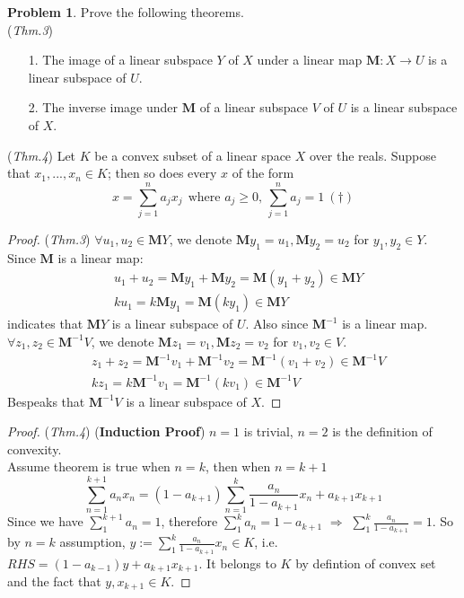 \documentclass[a4paper, 10pt]{article}
\theoremstyle{definition}
\newtheorem{problem}{Problem}
\theoremstyle{hSol}
\begin{document}
\begin{problem} Prove the following theorems. \\
(\textit{Thm.3}) 
\begin{itemize}
  \item[1.] The image of a linear subspace $Y$ of $X$ under a linear map $\bm{M}:X\to U$ is a linear subspace of $U$.
  \item[2.] The inverse image under $\bm{M}$ of a linear subspace $V$ of $U$ is a linear subspace of $X$.
\end{itemize}
(\textit{Thm.4}) Let $K$ be a convex subset of a linear space $X$ over the reals. Suppose that $x_1, ..., x_n\in K$; then so does every $x$ of the form
$$x=\sum_{j=1}^n a_jx_j~~\text{where $a_j\geq 0$, $\sum_{j=1}^n a_j=1$}~(\dag)$$
\end{problem}
\begin{proof} (\textit{Thm.3}) $\forall u_1, u_2 \in \bm{M}Y$, we denote $\bm{M}y_1 = u_1, \bm{M}y_2 = u_2$ for $y_1, y_2 \in Y$. \\
Since $\bm{M}$ is a linear map:
\begin{equation}
  \begin{split}
    &u_1+u_2 = \bm{M}y_1 + \bm{M}y_2 = \bm{M}(y_1+y_2) \in \bm{M}Y \\
    &ku_1 = k\bm{M}y_1 = \bm{M}(ky_1) \in \bm{M}Y
  \end{split}
\end{equation}
indicates that $\bm{M}Y$ is a linear subspace of $U$. Also since $\bm{M}^{-1}$ is a linear map. $\forall z_1, z_2 \in \bm{M}^{-1}V$, we denote $\bm{M}z_1 = v_1, \bm{M}z_2 = v_2$ for $v_1, v_2 \in V$.
\begin{equation}
  \begin{split}
    &z_1+z_2 = \bm{M}^{-1}v_1 + \bm{M}^{-1}v_2 = \bm{M}^{-1}(v_1+v_2) \in \bm{M}^{-1}V \\
    &kz_1 = k\bm{M}^{-1}v_1 = \bm{M}^{-1}(kv_1) \in \bm{M}^{-1}V
  \end{split}
\end{equation}
Bespeaks that $\bm{M}^{-1}V$ is a linear subspace of $X$.
\end{proof} 

\begin{proof} (\textit{Thm.4}) (\textbf{Induction Proof}) $n=1$ is trivial, $n=2$ is the definition of convexity. \\
Assume theorem is true when $n=k$, then when $n=k+1$
\begin{equation}
  \sum_{n=1}^{k+1} a_nx_n = (1-a_{k+1})\sum_{n=1}^{k}\frac{a_n}{1-a_{k+1}}x_n + a_{k+1}x_{k+1}
\end{equation}
Since we have $\sum_{1}^{k+1}a_n=1$, therefore $\sum_{1}^{k}a_n=1-a_{k+1}$ $\Rightarrow$ $\sum_{1}^{k}\frac{a_n}{1-a_{k+1}}=1$. So by $n=k$ assumption, $y:=\sum_{1}^{k}\frac{a_n}{1-a_{k+1}}x_n \in K$, i.e. $RHS = (1-a_{k-1})y + a_{k+1} x_{k+1}$. It belongs to $K$ by defintion of convex set and the fact that $y, x_{k+1} \in K$.
\end{proof}
\end{document}
